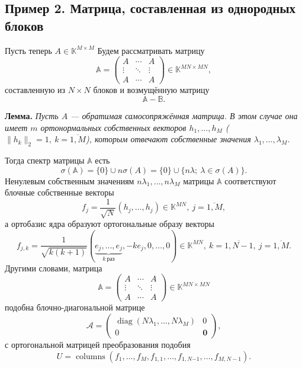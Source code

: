 \documentclass[12pt]{article}
\begin{document}
\subsection*{Пример 2. Матрица, составленная из однородных блоков}
Пусть теперь \( A\in \mathbb{K}^{M\times M} \)
Будем рассматривать матрицу
\[
    \mathbb{A} =
    \begin{pmatrix}
        A      & \cdots & A \\
        \vdots & \ddots & \vdots \\
        A      & \cdots & A
    \end{pmatrix}
    \in \mathbb{K}^{MN{\times}MN},
    \]
    составленную из \( N\times N \) блоков
    и возмущённую матрицу
\[
    \mathbb{A} - \mathbb{B}.
    \]

\begingroup
\textbf{Лемма.}\itshape
    Пусть \( A \) --- обратимая самосопряжённая матрица.
    В этом случае она имеет \( m \) ортонормальных
    собственных векторов \( h_1, \ldots, h_M \)
    (\( \|h_k\|_2=1,\ k{=}\overline{1,M} \)),
    которым отвечают собственные значения \( \lambda_1, \ldots, \lambda_M \).

    Тогда спектр матрицы \( \mathbb{A} \) есть
    \[
        \sigma(\mathbb{A}) = \{0\} \cup n\sigma(A)
        = \{ 0 \} \cup \{ n\lambda;\ \lambda\in\sigma(A) \}.
        \]
    Ненулевым собственным значениям \( n\lambda_1, \ldots, n\lambda_M \)
    матрицы \( \mathbb{A} \)
    соответствуют блочные собственные векторы
    \[
        f_j = \frac{1}{\sqrt{N}}(h_j, \ldots, h_j)\in\mathbb{K}^{MN},
        \ j{=}\overline{1,M},
       \]
    а ортобазис ядра образуют ортогональные образу
    векторы
    \[
        f_{j,k} =
        \frac{1}{\sqrt{k(k+1)}}
        (\underbrace{e_j,\ldots,e_j}_{k\ \text{раз}}, -ke_j, 0, \ldots, 0)\in\mathbb{K}^{MN},
        \ k{=}\overline{1,N-1},
        \ j{=}\overline{1,M}.
        \]
    Другими словами, матрица
    \[
        \mathbb{A} =
        \begin{pmatrix}
            A      & \cdots & A \\
            \vdots & \ddots & \vdots \\
            A      & \cdots & A
        \end{pmatrix}
        \in\mathbb{K}^{MN{\times}MN}
        \]
    подобна блочно-диагональной матрице
    \[
        \mathcal{A} =
        \left(\begin{array}{c|c}
            \operatorname{diag}(N\lambda_1,\ldots,N\lambda_M) & 0 \\ \hline
            0 & \mathbf{0}
        \end{array}\right),
        \]
    с ортогональной матрицей преобразования подобия
    \[
        U = \operatorname{columns}
        \left(f_1, \ldots, f_M, f_{1,1}, \ldots, f_{1,N{-1}}, \ldots, f_{M,N{-}1}\right).
        \]
\endgroup
\end{document}
